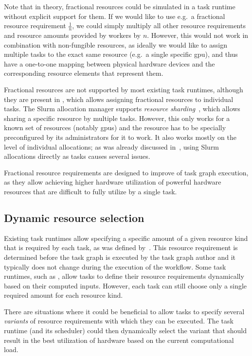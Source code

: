 Note that in theory, fractional resources could be simulated in a task runtime without explicit
support for them. If we would like to use e.g.\ a fractional resource requirement
$\frac{1}{n}$, we could simply multiply all other resource requirements and resource
amounts provided by workers by $n$. However, this would not work in combination
with non-fungible resources, as ideally we would like to assign multiple tasks to the exact same
resource (e.g.\ a single specific \gls{gpu}), and thus have a one-to-one mapping
between physical hardware devices and the corresponding resource elements that represent them.

Fractional resources are not supported by most existing task runtimes, although they are present in
\ray{}, which allows assigning fractional resources to individual tasks. The Slurm
allocation manager supports \emph{resource sharding}~\cite{slurm-sharding}, which allows sharing a
specific resource by multiple tasks. However, this only works for a known set of resources (notably
\glspl{gpu}) and the resource has to be specially preconfigured by its administrators
for it to work. It also works mostly on the level of individual allocations; as was already
discussed in~, using Slurm allocations directly as tasks causes several
issues.

Fractional resource requirements are designed to improve \efficiency{} of task graph
execution, as they allow achieving higher hardware utilization of powerful hardware resources
that are difficult to fully utilize by a single task.

\subsection{Dynamic resource selection}
\label{sec:dynamic-resource-selection}
Existing task runtimes allow specifying a specific amount of a given resource kind that is required
by each task, as was defined by~. This resource requirement is determined
before the task graph is executed by the task graph author and it typically does not change during
the execution of the workflow. Some task runtimes, such as \snakemake{}, allow tasks to
define their resource requirements dynamically based on their computed inputs. However, each task
can still choose only a single required amount for each resource kind.

There are situations where it could be beneficial to allow tasks to specify several
\emph{variants} of resource requirements with which they can be executed. The task runtime
(and its scheduler) could then dynamically select the variant that should result in the best
utilization of hardware based on the current computational load.

